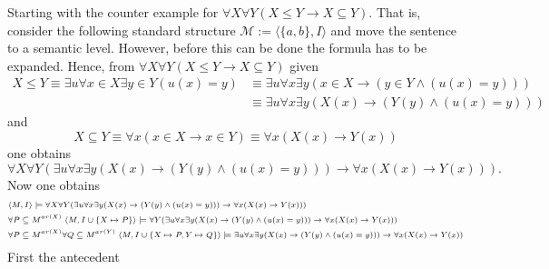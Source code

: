 \documentclass[11pt,a4paper]{article}
\begin{document}
Starting with the counter example for $\forall X \forall Y ( X \leq Y  \to X\subseteq Y) $. 
That is, consider the following standard structure $\mathcal{M}:= \langle \{a,b\}, I\rangle$ and move the sentence to a semantic level. However, before this can be done the formula has to be expanded. Hence, from 
$\forall X \forall Y ( X \leq Y  \to X\subseteq Y) $ given 
\begin{equation*}
\begin{split}
X \leq Y \equiv \exists u \forall x \in X \exists y \in Y (u(x)=y)& \equiv \exists u \forall x \exists y  (x \in X \to( y\in Y \land (u(x)=y))) \\
&\equiv  \exists u \forall x \exists y  (X(x) \to( Y(y) \land(u(x)=y)))
\end{split}
\end{equation*}
and
\begin{equation*}
X \subseteq Y \equiv \forall x (x\in X \to x \in Y) \equiv \forall x (X(x) \to Y(x))
\end{equation*}
one obtains 
\begin{equation*}
\forall X \forall Y (\exists u \forall x \exists y  (X(x) \to( Y(y) \land (u(x)=y)))  \to\forall x (X(x) \to Y(x)) ).
\end{equation*}
Now one obtains
\begin{equation*}
\scriptsize
\begin{split}
&\langle M, I\rangle \models \forall X \forall Y (\exists u \forall x \exists y  (X(x) \to( Y(y) \land (u(x)=y)))  \to\forall x (X(x) \to Y(x)) ) \\
&\forall P \subseteq M^{ar(X)}\; \langle M, I\cup \{X \mapsto P\}\rangle \models \forall Y (\exists u \forall x \exists y  (X(x) \to( Y(y) \land (u(x)=y)))  \to\forall x (X(x) \to Y(x)) ) \\
&\forall P \subseteq M^{ar(X)} \forall Q \subseteq M^{ar(Y)}\;\langle M, I\cup \{X \mapsto P, Y \mapsto Q\}\rangle \models \exists u \forall x \exists y  (X(x) \to( Y(y) \land (u(x)=y)))  \to\forall x (X(x) \to Y(x))\\
\end{split}
\end{equation*}
First the antecedent
\end{document}
